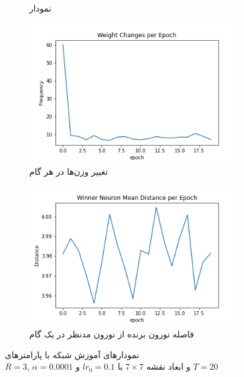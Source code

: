 \documentclass[12pt, a4paper]{article}
\begin{document}
\begin{figure}[h]
\begin{subfigure}{0.45\linewidth}
        \caption{نمودار }
    \end{subfigure}
    \newline
    \begin{subfigure}{0.45\linewidth}
        \includegraphics[width=\linewidth]{images/q5/r6/weight_change.png}
        \caption{تغییر وزن‌ها در هر گام}
    \end{subfigure}
    \hfill
    \begin{subfigure}{0.45\linewidth}
        \includegraphics[width=\linewidth]{images/q5/r6/winner_distance.png}
        \caption{فاصله نورون برنده از نورون مدنظر در یک گام}
    \end{subfigure}
    \caption{نمودار‌های آموزش شبکه  با پارامتر‌های \\$R=3$, $\alpha=0.0001$ و ابعاد نقشه $7 \times 7$ با $lr_0=0.1$ و $T=20$}
    \label{r6}
\end{figure}
\end{document}
